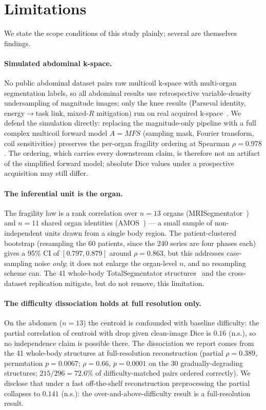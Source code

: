 \documentclass[10pt,twocolumn,letterpaper]{article}
\begin{document}
\section{Limitations}
\label{sec:limitations}

We state the scope conditions of this study plainly; several are themselves findings.

\paragraph{Simulated abdominal k-space.}
No public abdominal dataset pairs raw multicoil k-space with multi-organ segmentation labels, so all abdominal results use retrospective variable-density undersampling of magnitude images; only the knee results (Parseval identity, energy$\rightarrow$task link, mixed-$R$ mitigation) run on real acquired k-space~\cite{desai2022skmtea,zbontar2018fastmri}. We defend the simulation directly: replacing the magnitude-only pipeline with a full complex multicoil forward model $A = M F S$ (sampling mask, Fourier transform, coil sensitivities) preserves the per-organ fragility ordering at Spearman $\rho=0.978$. The ordering, which carries every downstream claim, is therefore not an artifact of the simplified forward model; absolute Dice values under a prospective acquisition may still differ.

\paragraph{The inferential unit is the organ.}
The fragility law is a rank correlation over $n=13$ organs (MRISegmentator~\cite{mrisegmentator2024}) and $n=11$ shared organ identities (AMOS~\cite{amos2022}) --- a small sample of non-independent units drawn from a single body region. The patient-clustered bootstrap (resampling the 60 patients, since the 240 series are four phases each) gives a 95\% CI of $[0.797, 0.879]$ around $\rho=0.863$, but this addresses case-sampling noise \emph{only}; it does not enlarge the organ-level $n$, and no resampling scheme can. The 41 whole-body TotalSegmentator structures~\cite{wasserthal2023totalseg} and the cross-dataset replication mitigate, but do not remove, this limitation.

\paragraph{The difficulty dissociation holds at full resolution only.}
On the abdomen ($n=13$) the centroid is confounded with baseline difficulty: the partial correlation of centroid with drop given clean-image Dice is $0.16$ (n.s.), so no independence claim is possible there. The dissociation we report comes from the 41 whole-body structures at full-resolution reconstruction (partial $\rho=0.389$, permutation $p=0.0067$; $\rho=0.66$, $p=0.0001$ on the 30 gradually-degrading structures; $215/296=72.6\%$ of difficulty-matched pairs ordered correctly). We disclose that under a fast off-the-shelf reconstruction preprocessing the partial collapses to $0.141$ (n.s.): the over-and-above-difficulty result is a full-resolution result.
\end{document}

